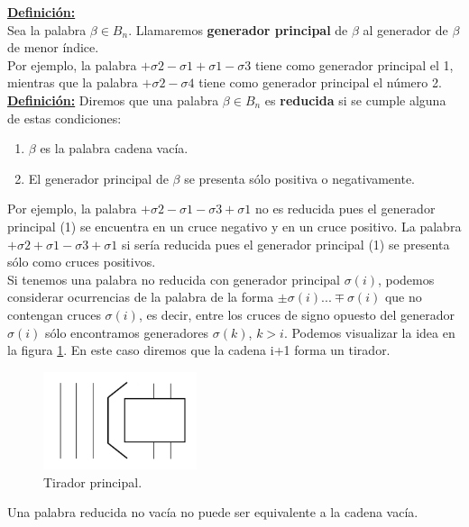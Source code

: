 \documentclass[14pt]{extarticle}
\begin{document}
\underline{\textbf{Definición:}}\\
Sea la palabra $\beta \in B_{n}$. Llamaremos \textbf{generador principal} de $\beta$ al generador de $\beta$ de menor índice.\\

Por ejemplo, la palabra $+\sigma2-\sigma1+\sigma1-\sigma3$ tiene como generador principal el 1, mientras que la palabra $+\sigma2-\sigma4$ tiene como generador principal el número 2. \\

\textbf{\underline{Definición:}}
Diremos que una palabra $\beta \in B_{n}$ es \textbf{reducida} si se cumple alguna de estas condiciones:
\begin{enumerate}
	\item $\beta$ es la palabra cadena vacía.
	\item El generador principal de $\beta$ se presenta sólo positiva o negativamente. 
\end{enumerate}
 
Por ejemplo, la palabra $+\sigma2-\sigma1-\sigma3+\sigma1$ no es reducida pues el generador principal (1) se encuentra en un cruce negativo y en un cruce positivo. La palabra $+\sigma2+\sigma1-\sigma3+\sigma1$ si sería reducida pues el generador principal (1) se presenta sólo como cruces positivos.\\

Si tenemos una palabra no reducida con generador principal $ \sigma(i) $, podemos considerar ocurrencias de la palabra de la forma $ \pm \sigma(i) ... \mp \sigma(i) $ que no contengan cruces $ \sigma(i) $, es decir, entre los cruces de signo opuesto del generador $ \sigma(i) $ sólo encontramos generadores $ \sigma(k) $, $ k>i $. Podemos visualizar la idea en la figura \ref{h1}. En este caso diremos que la cadena i+1 forma un tirador.\\
\begin{figure}[h!]
	\centering
	\includegraphics[width=4.5cm]{itrenzas/h11.png}
	\caption{Tirador principal.}
	\label{h1} 
\end{figure}

\begin{pro}
	Una palabra reducida no vacía no puede ser equivalente a la cadena vacía.
\end{pro}
\end{document}
